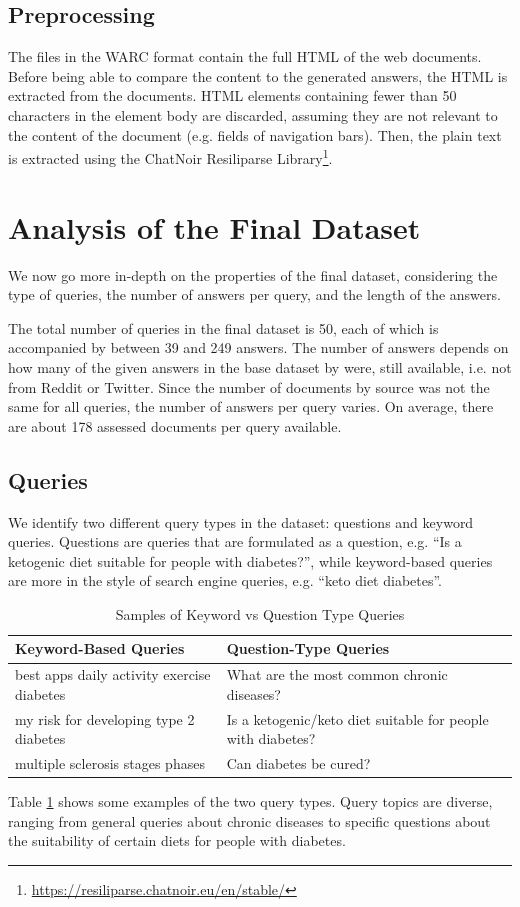 \subsection{Preprocessing}
The files in the WARC format contain the full HTML of the web documents.
Before being able to compare the content to the generated answers, the HTML is extracted from the documents.
HTML elements containing fewer than 50 characters in the element body are discarded, assuming they are not relevant to the content of the document (e.g. fields of navigation bars).
Then, the plain text is extracted using the ChatNoir Resiliparse Library\footnote{\url{https://resiliparse.chatnoir.eu/en/stable/}}.

\section{Analysis of the Final Dataset}
We now go more in-depth on the properties of the final dataset, considering the type of queries, the number of answers per query, and the length of the answers.

The total number of queries in the final dataset is 50, each of which is accompanied by between 39 and 249 answers.
The number of answers depends on how many of the given answers in the base dataset by \cite{goeuriot:2021:Consumer} were, still available, i.e. not from Reddit or Twitter.
Since the number of documents by source was not the same for all queries, the number of answers per query varies.
On average, there are about 178 assessed documents per query available.

\subsection{Queries}
We identify two different query types in the dataset: questions and keyword queries.
Questions are queries that are formulated as a question, e.g. ``Is a ketogenic diet suitable for people with diabetes?'', while keyword-based queries are more in the style of search engine queries, e.g. ``keto diet diabetes''.
\begin{table}[tb]
\centering
\begin{tabularx}{\textwidth}{XX}
\hline
\textbf{Keyword-Based Queries} & \textbf{Question-Type Queries} \\
\hline
best apps daily activity exercise diabetes & What are the most common chronic diseases? \\
\hline
my risk for developing type 2 diabetes & Is a ketogenic/keto diet suitable for people with diabetes? \\
\hline
multiple sclerosis stages phases & Can diabetes be cured? \\
\hline
\end{tabularx}
\caption{Samples of Keyword vs Question Type Queries}
\label{table:querie-samples}
\end{table}
Table \ref{table:querie-samples} shows some examples of the two query types.
Query topics are diverse, ranging from general queries about chronic diseases to specific questions about the suitability of certain diets for people with diabetes.

